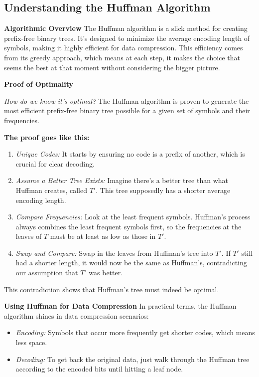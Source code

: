 \documentclass[12pt]{book} %
\begin{document}
\subsection{Understanding the Huffman Algorithm}

\textbf{Algorithmic Overview}
\FloatBarrier
The Huffman algorithm is a slick method for creating prefix-free binary trees. It's designed to minimize the average encoding length of symbols, making it highly efficient for data compression. This efficiency comes from its greedy approach, which means at each step, it makes the choice that seems the best at that moment without considering the bigger picture.

\textbf{Proof of Optimality}

\textit{How do we know it's optimal?} The Huffman algorithm is proven to generate the most efficient prefix-free binary tree possible for a given set of symbols and their frequencies.

\textbf{The proof goes like this:}
\begin{enumerate}
    \item \textit{Unique Codes:} It starts by ensuring no code is a prefix of another, which is crucial for clear decoding.
    
    \item \textit{Assume a Better Tree Exists:} Imagine there's a better tree than what Huffman creates, called $T'$. This tree supposedly has a shorter average encoding length.
    
    \item \textit{Compare Frequencies:} Look at the least frequent symbols. Huffman’s process always combines the least frequent symbols first, so the frequencies at the leaves of $T$ must be at least as low as those in $T'$.
    
    \item \textit{Swap and Compare:} Swap in the leaves from Huffman’s tree into $T'$. If $T'$ still had a shorter length, it would now be the same as Huffman’s, contradicting our assumption that $T'$ was better.
\end{enumerate}

This contradiction shows that Huffman’s tree must indeed be optimal.

\textbf{Using Huffman for Data Compression}
\FloatBarrier
In practical terms, the Huffman algorithm shines in data compression scenarios:
\begin{itemize}
    \item \textit{Encoding:} Symbols that occur more frequently get shorter codes, which means less space.
    \item \textit{Decoding:} To get back the original data, just walk through the Huffman tree according to the encoded bits until hitting a leaf node.
\end{itemize}
\end{document}
